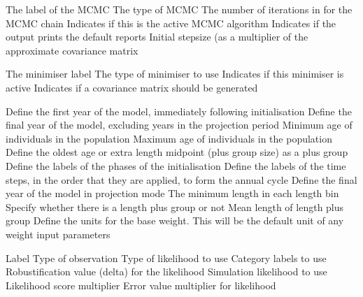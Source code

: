  {The label of the MCMC}
 {The type of MCMC}
 {The number of iterations in for the MCMC chain}
 {Indicates if this is the active MCMC algorithm}
 {Indicates if the output prints the default reports}
 {Initial stepsize (as a multiplier of the approximate covariance matrix}
\par\par
{} {The minimiser label}
 {The type of minimiser to use}
 {Indicates if this minimiser is active}
 {Indicates if a covariance matrix should be generated}
\par\par
{} {Define the first year of the model, immediately following initialisation}
 {Define the final year of the model, excluding years in the projection period}
 {Minimum age of individuals in the population}
 {Maximum age of individuals in the population}
 {Define the oldest age or extra length midpoint (plus group size) as a plus group}
 {Define the labels of the phases of the initialisation}
 {Define the labels of the time steps, in the order that they are applied, to form the annual cycle}
 {Define the final year of the model in projection mode}
 {The minimum length in each length bin}
 {Specify whether there is a length plus group or not}
 {Mean length of length plus group}
 {Define the units for the base weight. This will be the default unit of any weight input parameters}
\par\par
{} {Label}
 {Type of observation}
 {Type of likelihood to use}
 {Category labels to use}
 {Robustification value (delta) for the likelihood}
 {Simulation likelihood to use}
 {Likelihood score multiplier}
 {Error value multiplier for likelihood}
\par\textbf{}\par
